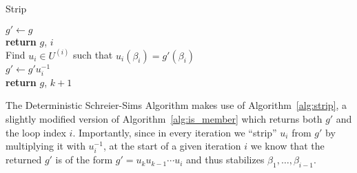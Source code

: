 \begin{algorithm}
  \caption{Strip}
  \label{alg:strip}
  \begin{algorithmic}[1]
       \State $g' \gets g$
       \\
            \State \textbf{return} $g$, $i$
          \EndIf
          \\
          \State Find $u_i \in U^{(i)}$ such that $u_i(\beta_i) = g'(\beta_i)$
          \\
          \State $g' \gets g' u_i^{-1}$
       \EndFor
       \\
       \State \textbf{return} $g$, $k + 1$
    \EndProcedure
  \end{algorithmic}
\end{algorithm}

The Deterministic Schreier-Sims Algorithm makes use of
Algorithm~\ref{alg:strip}, a slightly modified version of
Algorithm~\ref{alg:is_member} which returns both $g'$ and the loop index $i$.
Importantly, since in every iteration we ``strip'' $u_i$ from $g'$ by
multiplying it with $u_i^{-1}$, at the start of a given iteration $i$ we know
that the returned $g'$ is of the form $g' = u_k u_{k-1} \cdots u_i$ and thus
stabilizes $\beta_1, \dots, \beta_{i-1}$.


